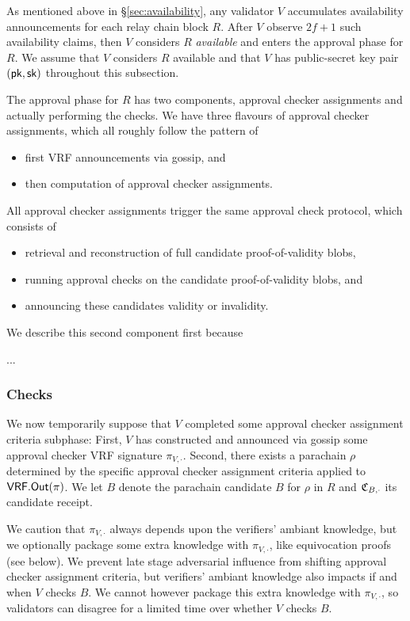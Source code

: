 As mentioned above in \S\ref{sec:availability}, any validator $V$ accumulates availability announcements for each relay chain block $R$.  After $V$ observe $2f+1$ such availability claims, then $V$ considers $R$ {\em available} and enters the approval phase for $R$.  We assume that $V$ considers $R$ available and that $V$ has public-secret key pair $(\mathsf{pk},\mathsf{sk})$ throughout this subsection.

The approval phase for $R$ has two components, approval checker assignments and actually performing the checks.  We have three flavours of approval checker assignments, which all roughly follow the pattern of
\begin{itemize}
\item first VRF announcements via gossip, and
\item then computation of approval checker assignments.
\end{itemize}
\noindent 
All approval checker assignments trigger the same approval check protocol, which consists of
\begin{itemize}
\item retrieval and reconstruction of full candidate proof-of-validity blobs, 
\item running approval checks on the candidate proof-of-validity blobs, and 
\item announcing these candidates validity or invalidity.
\end{itemize}
We describe this second component first because 

...

\subsubsection{Checks} 

We now temporarily suppose that $V$ completed some approval checker assignment criteria subphase:  First, $V$ has constructed and announced via gossip some approval checker VRF signature $\pi_{V,\cdot}$.  Second, there exists a parachain $\rho$ determined by the specific approval checker assignment criteria applied to $\mathsf{VRF}.\mathsf{Out}(\pi)$.  We let $B$ denote the parachain candidate $B$ for $\rho$ in $R$ and $\mathfrak{C}_{B,\cdot}$ its candidate receipt.  

We caution that $\pi_{V,\cdot}$ always depends upon the verifiers' ambiant knowledge, but we optionally package some extra knowledge with $\pi_{V,\cdot}$, like equivocation proofs (see below).  We prevent late stage adversarial influence from shifting approval checker assignment criteria, but verifiers' ambiant knowledge also impacts if and when $V$ checks $B$.  We cannot however package this extra knowledge with $\pi_{V,\cdot}$, so validators can disagree for a limited time over whether $V$ checks $B$.

